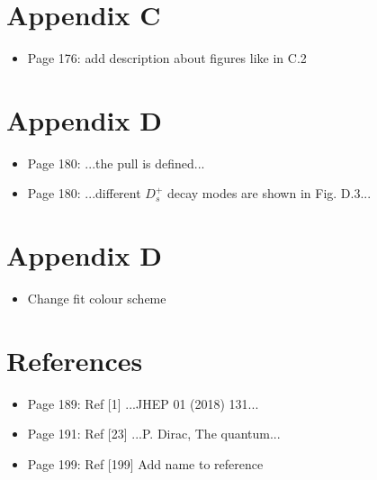 \documentclass[12pt]{article}
\begin{document}
\section{Appendix C}

\begin{itemize}
\item Page 176: {\color{blue} add description about figures like in C.2}



\end{itemize}
\section{Appendix D}

\begin{itemize}
\item Page 180: ...the {\color{red}pull} is defined...  
\item Page 180: ...different $D_s^+$ decay modes are shown in {\color{red}Fig. D.3}...


\end{itemize}
\section{Appendix D}

\begin{itemize}
\item {\color{blue} Change fit colour scheme}

\end{itemize}
\section{References}


\begin{itemize}
\item Page 189: Ref [1] ...JHEP 01 (2018) {\color{red}131}...
\item Page 191: Ref [23] ...{\color{red}P. Dirac}, The quantum...
\item Page 199: Ref [199]  Add name to reference




\end{itemize}
\end{document}
